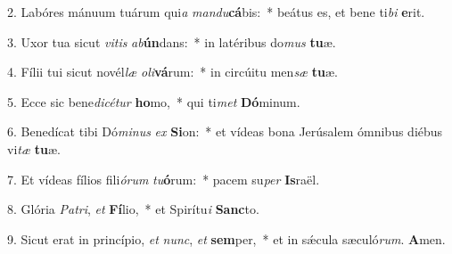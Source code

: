 2. Labóres mánuum tuárum qui\textit{a} \textit{man}\textit{du}\textbf{cá}bis:~*  beátus es, et bene ti\textit{bi} \textbf{e}rit.\

3. Uxor tua sicut \textit{vi}\textit{tis} \textit{ab}\textbf{ún}dans:~*  in latéribus do\textit{mus} \textbf{tu}æ.\

4. Fílii tui sicut novél\textit{læ} \textit{o}\textit{li}\textbf{vá}rum:~*  in circúitu men\textit{sæ} \textbf{tu}æ.\

5. Ecce sic bene\textit{di}\textit{cé}\textit{tur} \textbf{ho}mo,~*  qui ti\textit{met} \textbf{Dó}minum.\

6. Benedícat tibi Dó\textit{mi}\textit{nus} \textit{ex} \textbf{Si}on:~*  et vídeas bona Jerúsalem ómnibus diébus vi\textit{tæ} \textbf{tu}æ.\

7. Et vídeas fílios fili\textit{ó}\textit{rum} \textit{tu}\textbf{ó}rum:~*  pacem su\textit{per} \textbf{Is}raël.\

8. Glória \textit{Pa}\textit{tri}, \textit{et} \textbf{Fí}lio,~*  et Spirítu\textit{i} \textbf{Sanc}to.\

9. Sicut erat in princípio, \textit{et} \textit{nunc}, \textit{et} \textbf{sem}per,~*  et in sǽcula sæculó\textit{rum}. \textbf{A}men.\

